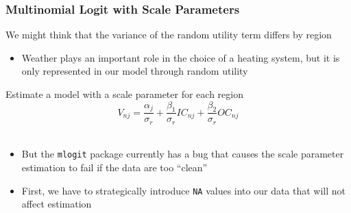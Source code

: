 \documentclass{beamer}\usepackage[]{graphicx}\usepackage[]{color}
\makeatletter
\newcommand{\hlnum}[1]{\textcolor[rgb]{0.686,0.059,0.569}{#1}}%
\newcommand{\hlstr}[1]{\textcolor[rgb]{0.192,0.494,0.8}{#1}}%
\newcommand{\hlcom}[1]{\textcolor[rgb]{0.678,0.584,0.686}{\textit{#1}}}%
\newcommand{\hlopt}[1]{\textcolor[rgb]{0,0,0}{#1}}%
\newcommand{\hlstd}[1]{\textcolor[rgb]{0.345,0.345,0.345}{#1}}%
\newcommand{\hlkwb}[1]{\textcolor[rgb]{0.69,0.353,0.396}{#1}}%
\newcommand{\hlkwc}[1]{\textcolor[rgb]{0.333,0.667,0.333}{#1}}%
\newcommand{\hlkwd}[1]{\textcolor[rgb]{0.737,0.353,0.396}{\textbf{#1}}}%
\newenvironment{kframe}{%
 \def\at@end@of@kframe{}%
 \ifinner\ifhmode%
  \def\at@end@of@kframe{\end{minipage}}%
  \begin{minipage}{\columnwidth}%
 \fi\fi%
 \def\FrameCommand##1{\hskip\@totalleftmargin \hskip-\fboxsep
 \colorbox{shadecolor}{##1}\hskip-\fboxsep
     \hskip-\linewidth \hskip-\@totalleftmargin \hskip\columnwidth}%
 \MakeFramed {\advance\hsize-\width
   \@totalleftmargin\z@ \linewidth\hsize
   \@setminipage}}%
 {\par\unskip\endMakeFramed%
 \at@end@of@kframe}
\newenvironment{knitrout}{}{} %
\makeatother
\begin{document}
\begin{frame}\frametitle{Multinomial Logit with Scale Parameters}
    We might think that the variance of the random utility term differs by region
    \begin{itemize}
    	\item Weather plays an important role in the choice of a heating system, but it is only represented in our model through random utility
    \end{itemize}
    \vspace{2ex}
    Estimate a model with a scale parameter for each region
    $$V_{nj} = \frac{\alpha_j}{\sigma_r} + \frac{\beta_1}{\sigma_r} IC_{nj} + \frac{\beta_2}{\sigma_r} OC_{nj}$$ \\
    \vspace{-1ex}
    \begin{itemize}
    	\item But the \texttt{mlogit} package currently has a bug that causes the scale parameter estimation to fail if the data are too ``clean''
    	\item First, we have to strategically introduce \texttt{NA} values into our data that will not affect estimation
    \end{itemize}
\end{frame}

\end{document}

